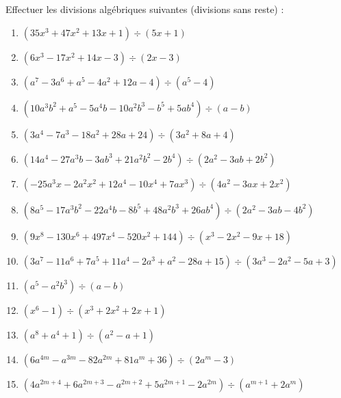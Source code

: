 \begin{exercice}
Effectuer les divisions algébriques suivantes (divisions sans reste) :
\begin{multicols}{2}
\begin{enumerate}
\item $(35{{x}^{3}}+47{{x}^{2}}+13x+1)\div (5x+1)$
\item $(6{{x}^{3}}-17{{x}^{2}}+14x-3)\div (2x-3)$
\item $({{a}^{7}}-3{{a}^{6}}+{{a}^{5}}-4{{a}^{2}}+12a-4)\div ({{a}^{5}}-4)$
\item $(10{{a}^{3}}{{b}^{2}}+{{a}^{5}}-5{{a}^{4}}b-10{{a}^{2}}{{b}^{3}}-{{b}^{5}}+5a{{b}^{4}})\div (a-b)$
\item $(3{{a}^{4}}-7{{a}^{3}}-18{{a}^{2}}+28a+24)\div (3{{a}^{2}}+8a+4)$
\item $(14{{a}^{4}}-27{{a}^{3}}b-3a{{b}^{3}}+21{{a}^{2}}{{b}^{2}}-2{{b}^{4}})\div (2{{a}^{2}}-3ab+2{{b}^{2}})$
\item $(-25{{a}^{3}}x-2{{a}^{2}}{{x}^{2}}+12{{a}^{4}}-10{{x}^{4}}+7a{{x}^{3}})\div (4{{a}^{2}}-3ax+2{{x}^{2}})$
\item $(8{{a}^{5}}-17{{a}^{3}}{{b}^{2}}-22{{a}^{4}}b-8{{b}^{5}}+48{{a}^{2}}{{b}^{3}}+26a{{b}^{4}})\div (2{{a}^{2}}-3ab-4{{b}^{2}})$
\item $(9{{x}^{8}}-130{{x}^{6}}+497{{x}^{4}}-520{{x}^{2}}+144)\div ({{x}^{3}}-2{{x}^{2}}-9x+18)$
\item $(3{{a}^{7}}-11{{a}^{6}}+7{{a}^{5}}+11{{a}^{4}}-2{{a}^{3}}+{{a}^{2}}-28a+15)\div (3{{a}^{3}}-2{{a}^{2}}-5a+3)$
\item $({{a}^{5}}-{{a}^{2}}{{b}^{3}})\div (a-b)$
\item $({{x}^{6}}-1)\div ({{x}^{3}}+2{{x}^{2}}+2x+1)$
\item $({{a}^{8}}+{{a}^{4}}+1)\div ({{a}^{2}}-a+1)$
\item $(6{{a}^{4m}}-{{a}^{3m}}-82{{a}^{2m}}+81{{a}^{m}}+36)\div (2{{a}^{m}}-3)$
\item $(4{{a}^{2m+4}}+6{{a}^{2m+3}}-{{a}^{2m+2}}+5{{a}^{2m+1}}-2{{a}^{2m}})\div ({{a}^{m+1}}+2{{a}^{m}})$
\end{enumerate}
\end{multicols}
\end{exercice}

